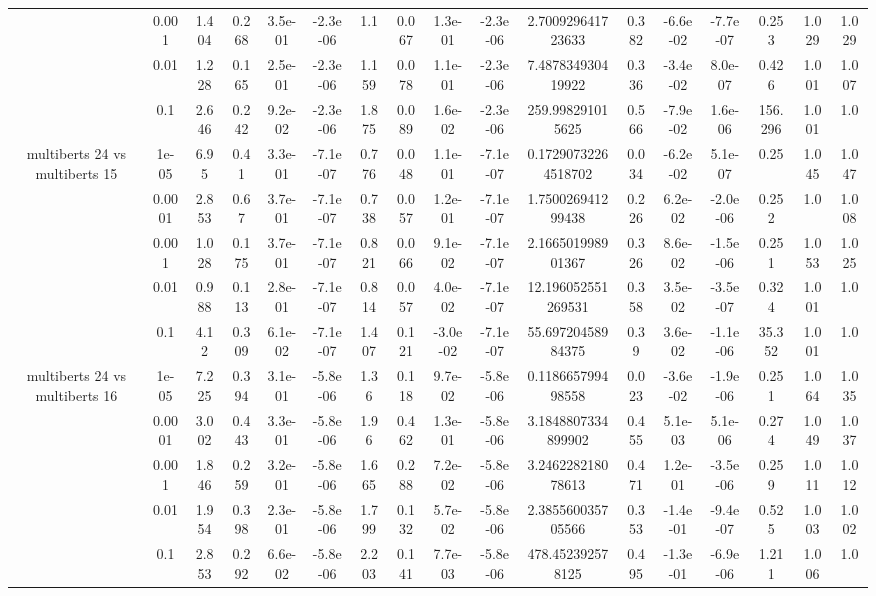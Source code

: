\begin{tabular}{|c|c|c|c|c|c|c|c|c|c|c|c|c|c|c|c|c|}
 & 0.001 & 1.404 & 0.268 & 3.5e-01 & -2.3e-06 & 1.1 & 0.067 & 1.3e-01 & -2.3e-06 & 2.700929641723633 & 0.382 & -6.6e-02 & -7.7e-07 & 0.253 & 1.029 & 1.029 \\
 & 0.01 & 1.228 & 0.165 & 2.5e-01 & -2.3e-06 & 1.159 & 0.078 & 1.1e-01 & -2.3e-06 & 7.487834930419922 & 0.336 & -3.4e-02 & 8.0e-07 & 0.426 & 1.001 & 1.007 \\
 & 0.1 & 2.646 & 0.242 & 9.2e-02 & -2.3e-06 & 1.875 & 0.089 & 1.6e-02 & -2.3e-06 & 259.998291015625 & 0.566 & -7.9e-02 & 1.6e-06 & 156.296 & 1.001 & 1.0 \\
\hline
\multirow{5}{*}{multiberts 24 vs multiberts 15} & 1e-05 & 6.95 & 0.41 & 3.3e-01 & -7.1e-07 & 0.776 & 0.048 & 1.1e-01 & -7.1e-07 & 0.17290732264518702 & 0.034 & -6.2e-02 & 5.1e-07 & 0.25 & 1.045 & 1.047 \\
 & 0.0001 & 2.853 & 0.67 & 3.7e-01 & -7.1e-07 & 0.738 & 0.057 & 1.2e-01 & -7.1e-07 & 1.750026941299438 & 0.226 & 6.2e-02 & -2.0e-06 & 0.252 & 1.0 & 1.008 \\
 & 0.001 & 1.028 & 0.175 & 3.7e-01 & -7.1e-07 & 0.821 & 0.066 & 9.1e-02 & -7.1e-07 & 2.166501998901367 & 0.326 & 8.6e-02 & -1.5e-06 & 0.251 & 1.053 & 1.025 \\
 & 0.01 & 0.988 & 0.113 & 2.8e-01 & -7.1e-07 & 0.814 & 0.057 & 4.0e-02 & -7.1e-07 & 12.196052551269531 & 0.358 & 3.5e-02 & -3.5e-07 & 0.324 & 1.001 & 1.0 \\
 & 0.1 & 4.12 & 0.309 & 6.1e-02 & -7.1e-07 & 1.407 & 0.121 & -3.0e-02 & -7.1e-07 & 55.69720458984375 & 0.39 & 3.6e-02 & -1.1e-06 & 35.352 & 1.001 & 1.0 \\
\hline
\multirow{5}{*}{multiberts 24 vs multiberts 16} & 1e-05 & 7.225 & 0.394 & 3.1e-01 & -5.8e-06 & 1.36 & 0.118 & 9.7e-02 & -5.8e-06 & 0.118665799498558 & 0.023 & -3.6e-02 & -1.9e-06 & 0.251 & 1.064 & 1.035 \\
 & 0.0001 & 3.002 & 0.443 & 3.3e-01 & -5.8e-06 & 1.96 & 0.462 & 1.3e-01 & -5.8e-06 & 3.1848807334899902 & 0.455 & 5.1e-03 & 5.1e-06 & 0.274 & 1.049 & 1.037 \\
 & 0.001 & 1.846 & 0.259 & 3.2e-01 & -5.8e-06 & 1.665 & 0.288 & 7.2e-02 & -5.8e-06 & 3.246228218078613 & 0.471 & 1.2e-01 & -3.5e-06 & 0.259 & 1.011 & 1.012 \\
 & 0.01 & 1.954 & 0.398 & 2.3e-01 & -5.8e-06 & 1.799 & 0.132 & 5.7e-02 & -5.8e-06 & 2.385560035705566 & 0.353 & -1.4e-01 & -9.4e-07 & 0.525 & 1.003 & 1.002 \\
 & 0.1 & 2.853 & 0.292 & 6.6e-02 & -5.8e-06 & 2.203 & 0.141 & 7.7e-03 & -5.8e-06 & 478.452392578125 & 0.495 & -1.3e-01 & -6.9e-06 & 1.211 & 1.006 & 1.0 \\

\end{tabular}
